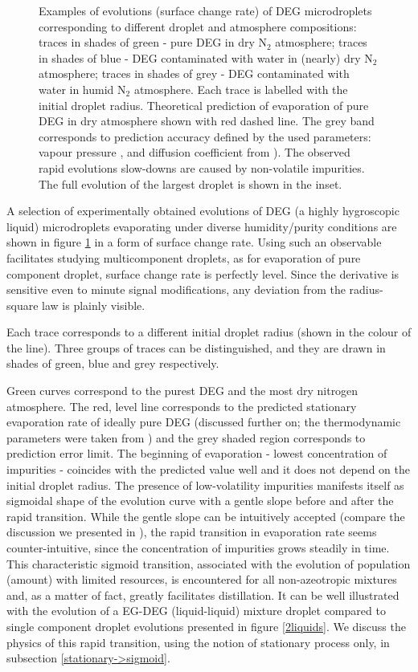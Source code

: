 \documentclass[twoside,twocolumn,9pt]{article}
\begin{document}
\begin{figure}[htb]
 \caption{Examples of evolutions (surface change rate) of DEG microdroplets corresponding to different droplet and atmosphere compositions: traces in shades of green - pure DEG in dry N$_2$ atmosphere; traces in shades of blue - DEG contaminated with water in (nearly) dry N$_2$ atmosphere; traces in shades of grey - DEG contaminated with water in humid N$_2$ atmosphere. Each trace is labelled with the initial droplet radius. Theoretical prediction of evaporation of pure DEG in dry atmosphere shown with red dashed line. The grey band corresponds to prediction accuracy defined by the used parameters: vapour pressure \cite{MEG}, and diffusion coefficient from \cite{Lugg}). The observed rapid evolutions slow-downs are caused by non-volatile impurities. The full evolution of the largest droplet is shown in the inset.}
 \label{2aaprim}
\end{figure}

A selection of experimentally obtained evolutions of DEG (a highly hygroscopic liquid) microdroplets evaporating under diverse humidity/purity conditions are shown in figure \ref{2aaprim} in a form of surface change rate. Using such an observable facilitates studying multicomponent droplets, as for evaporation of pure component droplet, surface change rate is perfectly level. Since the derivative is sensitive even to minute signal modifications, any deviation from the radius-square law is plainly visible.

Each trace corresponds to a different initial droplet radius (shown in the colour of the line). Three groups of traces can be distinguished, and they are drawn in shades of green, blue and grey respectively.

Green curves correspond to the purest DEG and the most dry nitrogen atmosphere. The red, level line corresponds to the predicted stationary evaporation rate of ideally pure DEG (discussed further on; the thermodynamic parameters were taken from \cite{DEG, Lugg}) and the grey shaded region corresponds to prediction error limit. The beginning of evaporation - lowest concentration of  impurities - coincides with the predicted value well and it does not depend on the initial droplet radius. The presence of low-volatility impurities manifests itself as sigmoidal shape of the evolution curve with a gentle slope before and after the rapid transition. While the gentle slope can be intuitively accepted (compare the discussion we presented in \cite{Acta}), the rapid transition in evaporation rate seems counter-intuitive, since the concentration of impurities grows steadily in time. This characteristic sigmoid transition, associated with the evolution of population (amount) with limited resources, is encountered for all non-azeotropic mixtures and, as a matter of fact, greatly facilitates distillation. It can be well illustrated with the evolution of a EG-DEG (liquid-liquid) mixture droplet compared to single component droplet evolutions presented in figure \ref{2liquids}. We discuss the physics of this rapid transition, using the notion of stationary process only, in subsection \ref{stationary->sigmoid}.
\end{document}
